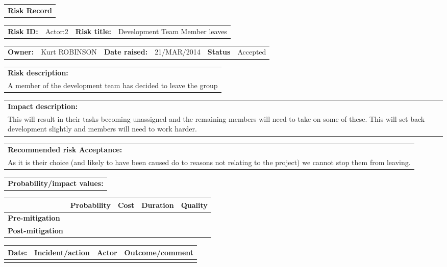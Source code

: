 \begin{table}
	\begin{tabularx}{\textwidth}{| X |}
		\hline
		\textbf{Risk Record} \\
	\end{tabularx}
	\begin{tabularx}{\textwidth}{| l | X | l | X |}
		\hline
		\textbf{Risk ID:} & Actor:2 & \textbf{Risk title:} & Development Team Member leaves \\
	\end{tabularx}
	\begin{tabularx}{\textwidth}{| l | X | l | X | l | X |}
		\hline
		\textbf{Owner:} & Kurt ROBINSON & \textbf{Date raised:} & 21/MAR/2014 & \textbf{Status} & Accepted \\
	\end{tabularx}
	\begin{tabularx}{\textwidth}{| X |}
		\hline
		\textbf{Risk description:} \\ A member of the development team has decided to leave the group \\
	\end{tabularx}
	\begin{tabularx}{\textwidth}{| X |}
		\hline
		\textbf{Impact description:} \\ This will result in their tasks becoming unassigned and the remaining members will need to take on some of these. This will set back development slightly and members will need to work harder. \\
	\end{tabularx}
	\begin{tabularx}{\textwidth}{| X |}
		\hline
		\textbf{Recommended risk Acceptance:} \\ As it is their choice (and likely to have been caused do to reasons not relating to the project) we cannot stop them from leaving. \\
	\end{tabularx}
	\begin{tabularx}{\textwidth}{| X |}
		\hline
		\textbf{Probability/impact values:} \\
	\end{tabularx}
	\begin{tabularx}{\textwidth}{| l | l | X | X | X |}
		\hline
		 &  \textbf{Probability} & \textbf{Cost} & \textbf{Duration} & \textbf{Quality} \\ \hline
		\textbf{Pre-mitigation} & & & & \\ \hline
		\textbf{Post-mitigation} & & & & \\ \hline \hline
	\end{tabularx}
	\begin{tabularx}{\textwidth}{| l | X | l | X |}
		\hline
		\textbf{Date:} & \textbf{Incident/action} & \textbf{Actor} & \textbf{Outcome/comment} \\ \hline
		 & &  &  \\ \hline
	\end{tabularx}
\end{table}

